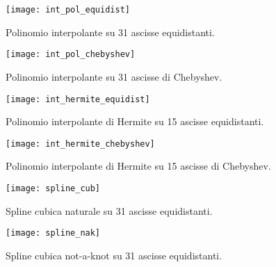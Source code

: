 \begin{figure}
  \centering
  \texttt{[image: int\_pol\_equidist]}
  \caption{Polinomio interpolante su 31 ascisse equidistanti.}
\end{figure}

\begin{figure}
  \centering
  \texttt{[image: int\_pol\_chebyshev]}
  \caption{Polinomio interpolante su 31 ascisse di Chebyshev.}
\end{figure}

\begin{figure}
  \centering
  \texttt{[image: int\_hermite\_equidist]}
  \caption{Polinomio interpolante di Hermite su 15 ascisse equidistanti.}
\end{figure}

\begin{figure}
  \centering
  \texttt{[image: int\_hermite\_chebyshev]}
  \caption{Polinomio interpolante di Hermite su 15 ascisse di Chebyshev.}
\end{figure}

\begin{figure}
  \centering
  \texttt{[image: spline\_cub]}
  \caption{Spline cubica naturale su 31 ascisse equidistanti.}
\end{figure}

\begin{figure}
  \centering
  \texttt{[image: spline\_nak]}
  \caption{Spline cubica not-a-knot su 31 ascisse equidistanti.}
\end{figure}